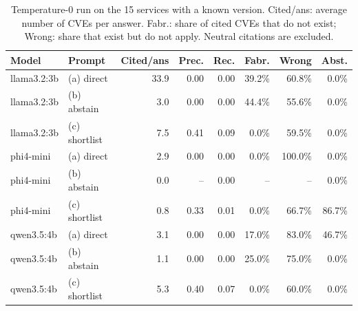 \begin{table}[t]
\centering
\small
\caption{Temperature-0 run on the 15 services with a known version. Cited/ans: average number of CVEs per answer. Fabr.: share of cited CVEs that do not exist; Wrong: share that exist but do not apply. Neutral citations are excluded.}
\label{tab:overall-t0}
\begin{tabular}{llrrrrrr}
\toprule
Model & Prompt & Cited/ans & Prec. & Rec. & Fabr. & Wrong & Abst. \\
\midrule
llama3.2:3b & (a) direct & 33.9 & 0.00 & 0.00 & 39.2\% & 60.8\% & 0.0\% \\
llama3.2:3b & (b) abstain & 3.0 & 0.00 & 0.00 & 44.4\% & 55.6\% & 0.0\% \\
llama3.2:3b & (c) shortlist & 7.5 & 0.41 & 0.09 & 0.0\% & 59.5\% & 0.0\% \\
\midrule
phi4-mini & (a) direct & 2.9 & 0.00 & 0.00 & 0.0\% & 100.0\% & 0.0\% \\
phi4-mini & (b) abstain & 0.0 & -- & 0.00 & -- & -- & 0.0\% \\
phi4-mini & (c) shortlist & 0.8 & 0.33 & 0.01 & 0.0\% & 66.7\% & 86.7\% \\
\midrule
qwen3.5:4b & (a) direct & 3.1 & 0.00 & 0.00 & 17.0\% & 83.0\% & 46.7\% \\
qwen3.5:4b & (b) abstain & 1.1 & 0.00 & 0.00 & 25.0\% & 75.0\% & 0.0\% \\
qwen3.5:4b & (c) shortlist & 5.3 & 0.40 & 0.07 & 0.0\% & 60.0\% & 0.0\% \\
\bottomrule
\end{tabular}
\end{table}
